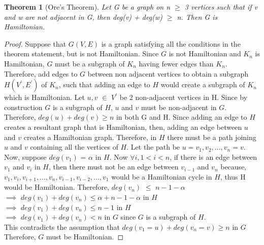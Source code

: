 \documentclass[12pt]{article}
\newtheorem{theorem}[definition]{Theorem}
\numberwithin{equation}{subsection}
\numberwithin{table}{subsection}
\numberwithin{algorithm}{subsection}
\numberwithin{figure}{subsection}
\begin{document}
\begin{theorem}[Ore's Theorem]
\label{ore's theorem}
Let G be a graph on n $\geq$ 3 vertices such that if v and w are not adjacent in G, then deg(v) + deg(w) $\geq$ n. Then G is Hamiltonian. {}
\end{theorem}
\begin{proof}
Suppose that $\mathit{G(V,E)}$ is a graph satisfying all the conditions in the theorem statement, but is not Hamiltonian. Since $\mathit{G}$ is not Hamiltonian and $K_n$ is Hamiltonian, $\mathit{G}$ must be a subgraph of $\mathit{K_n}$ having fewer edges than $\mathit{K_n}$. Therefore, add edges to $\mathit{G}$ between non adjacent vertices to obtain a subgraph $\mathit{H(V^\prime,E^\prime)}$ of $\mathit{K_n}$, such that adding an edge to $\mathit{H}$ would create a subgraph of $\mathit{K_n}$ which is Hamiltonian. Let $\mathit{u, v}$ $\in$ $V^\prime$ be 2 non-adjacent vertices in H. Since by construction $\mathit{G}$ is a subgraph of $\mathit{H}$, $u$ and $v$ must be non-adjacent in $\mathit{G}$. Therefore, $\mathit{deg(u) + deg(v) \geq n}$ in both G and H. Since adding an edge to $\mathit{H}$ creates a resultant graph that is Hamiltonian, then, adding an edge between $\mathit{u}$ and $\mathit{v}$ creates a Hamiltonian graph. Therefore, in $\mathit{H}$ there must be a path joining $\mathit{u}$ and $\mathit{v}$ containing all the vertices of $\mathit{H}$. Let the path be $\mathit{u = v_1, v_2, ..., v_n = v}$.\\
Now, suppose $\mathit{deg(v_1)}$ = $\alpha$ in $\mathit{H}$. Now $\forall \mathit{i}, 1 <  i < \mathit{n}$, if there is an edge between $\mathit{v_1}$ and $\mathit{v_i}$ in $\mathit{H}$, then there must not be an edge between $\mathit{v_{i-1}}$ and $\mathit{v_n}$ because, $\mathit{v_1, v_i, v_{i+1}, ..., v_n, v_{i-1}, v_{i-2}, ..., v_1}$ would be a Hamiltonian cycle in $\mathit{H}$, thus H would be Hamiltonian. Therefore, $\mathit{deg(v_n)}$ $\leq$ $\mathit{n-1-\alpha}$\\
$\implies$ $\mathit{deg(v_1) + deg(v_n) \leq \alpha +  n-1 - \alpha}$ in $\mathit{H}$\\
$\implies$ $\mathit{deg(v_1) + deg(v_n) \leq n-1}$ in $\mathit{H}$\\
$\implies$ $\mathit{deg(v_1) + deg(v_n) < n}$ in $\mathit{G}$ since $\mathit{G}$ is a subgraph of $\mathit{H}$.\\
This contradicts the assumption that $\mathit{deg(v_1 = u) + deg(v_n = v) \geq n}$ in $\mathit{G}$ \\
Therefore, $\mathit{G}$ must be Hamiltonian.
\end{proof}
\end{document}
